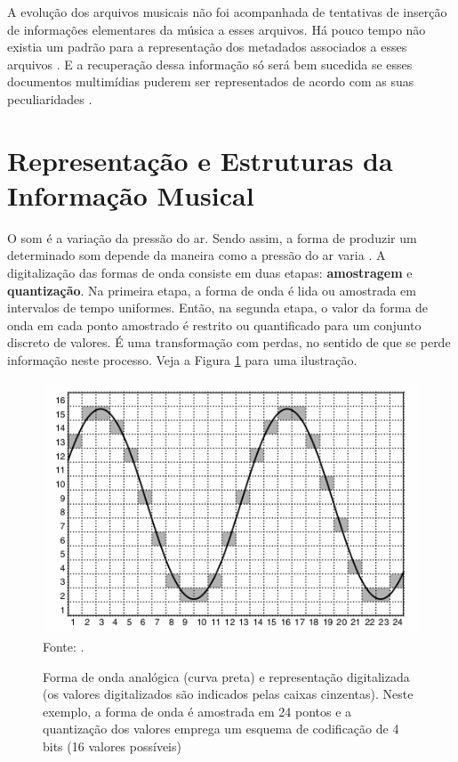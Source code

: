 A evolução dos arquivos musicais não foi acompanhada de tentativas de inserção de informações elementares da música a esses arquivos. Há pouco tempo não existia um padrão para a representação dos metadados associados a esses arquivos \cite{andrade&crispim2008}. E a recuperação dessa informação só será bem sucedida se esses documentos multimídias puderem ser representados de acordo com as suas peculiaridades \cite{gomes2015}.

\section{Representação e Estruturas da Informação Musical}

O som é a variação da pressão do ar. Sendo assim, a forma de produzir um determinado som depende da maneira como a pressão do ar varia \cite{miletto2004}. A digitalização das formas de onda consiste em duas etapas: \textbf{amostragem} e \textbf{quantização}. Na primeira etapa, a forma de onda é lida ou amostrada em intervalos de tempo uniformes. Então, na segunda etapa, o valor da forma de onda em cada ponto amostrado é restrito ou quantificado para um conjunto discreto de valores. É uma transformação com perdas, no sentido de que se perde informação neste processo. Veja a Figura \ref{fig:ondaAnalog} para uma ilustração.

\begin{figure}[!htb]
   \centering
   \caption{Forma de onda analógica (curva preta) e representação digitalizada (os valores digitalizados são indicados pelas caixas cinzentas). Neste exemplo, a forma de onda é amostrada em 24 pontos e a quantização dos valores emprega um esquema de codificação de 4 bits (16 valores possíveis)}\label{fig:ondaAnalog} 
   \includegraphics[scale=0.9]{figuras/ondaAnalog.png}
   Fonte: \cite{muller2007}.
\end{figure}

